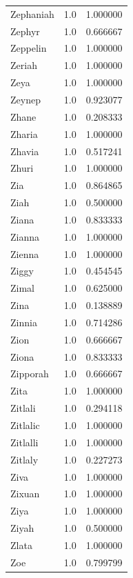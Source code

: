 \documentclass[
  letterpaper,
  DIV=11,
  numbers=noendperiod]{scrreprt}
\begin{document}
\begin{tabular}{lrr}
Zephaniah       &   1.0 &   1.000000 \\
Zephyr          &   1.0 &   0.666667 \\
Zeppelin        &   1.0 &   1.000000 \\
Zeriah          &   1.0 &   1.000000 \\
Zeya            &   1.0 &   1.000000 \\
Zeynep          &   1.0 &   0.923077 \\
Zhane           &   1.0 &   0.208333 \\
Zharia          &   1.0 &   1.000000 \\
Zhavia          &   1.0 &   0.517241 \\
Zhuri           &   1.0 &   1.000000 \\
Zia             &   1.0 &   0.864865 \\
Ziah            &   1.0 &   0.500000 \\
Ziana           &   1.0 &   0.833333 \\
Zianna          &   1.0 &   1.000000 \\
Zienna          &   1.0 &   1.000000 \\
Ziggy           &   1.0 &   0.454545 \\
Zimal           &   1.0 &   0.625000 \\
Zina            &   1.0 &   0.138889 \\
Zinnia          &   1.0 &   0.714286 \\
Zion            &   1.0 &   0.666667 \\
Ziona           &   1.0 &   0.833333 \\
Zipporah        &   1.0 &   0.666667 \\
Zita            &   1.0 &   1.000000 \\
Zitlali         &   1.0 &   0.294118 \\
Zitlalic        &   1.0 &   1.000000 \\
Zitlalli        &   1.0 &   1.000000 \\
Zitlaly         &   1.0 &   0.227273 \\
Ziva            &   1.0 &   1.000000 \\
Zixuan          &   1.0 &   1.000000 \\
Ziya            &   1.0 &   1.000000 \\
Ziyah           &   1.0 &   0.500000 \\
Zlata           &   1.0 &   1.000000 \\
Zoe             &   1.0 &   0.799799 \\

\end{tabular}
\end{document}
